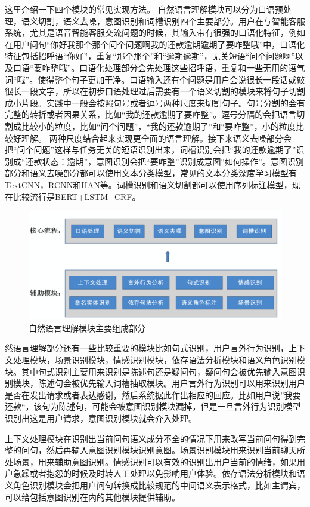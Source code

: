 这里介绍一下四个模块的常见实现方法。
自然语言理解模块可以分为口语预处理，语义切割，语义去噪，意图识别和词槽识别四个主要部分。用户在与智能客服系统，尤其是语音智能客服交流问题的时候，其输入带有很强的口语化特征，例如在用户问句“你好我那个那个问个问题啊我的还款逾期逾期了要咋整哦”中，口语化特征包括招呼语“你好”，重复“那个那个”和“逾期逾期”，无关短语“问个问题啊”以及口语“要咋整哦”。口语化处理部分会先处理这些招呼语，重复和一些无用的语气词“哦”。使得整个句子更加干净。口语输入还有个问题是用户会说很长一段话或敲很长一段文字，所以在初步口语处理过后需要有一个语义切割的模块来将句子切割成小片段。实践中一般会按照句号或者逗号两种尺度来切割句子。句号分割的会有完整的转折或者因果关系，比如“我的还款逾期了要咋整”。逗号分隔的会把语言切割成比较小的粒度，比如“问个问题”，“我的还款逾期了”和“要咋整”，小的粒度比较好理解。 两种尺度结合起来实现更全面的语言理解。接下来语义去噪部分会把“问个问题”这样与任务无关的短语识别出来，词槽识别会把“我的还款逾期了”识别成“还款状态：逾期”，意图识别会把“要咋整”识别成意图“如何操作”。意图识别部分和语义去噪部分都可以使用文本分类模型，常见的文本分类深度学习模型有TextCNN\cite{kim-2014-convolutional}，RCNN\cite{lai2015recurrent}和HAN\cite{yang2016hierarchical}等。词槽识别和语义切割都可以使用序列标注模型，现在比较流行是BERT+LSTM+CRF。
\begin{figure}[H]
\centering
\includegraphics[scale=0.25]{chapters/nlu_process.png}
\caption{自然语言理解模块主要组成部分}
\label{fig:parserexample}
\end{figure}
然语言理解部分还有一些比较重要的模块比如句式识别，用户言外行为识别，上下文处理模块，场景识别模块，情感识别模块，依存语法分析模块和语义角色识别模块。其中句式识别主要用来识别是陈述句还是疑问句，疑问句会被优先输入意图识别模块，陈述句会被优先输入词槽抽取模块。用户言外行为识别可以用来识别用户是否在发出请求或者表达感谢，然后系统据此作出相应的回应。比如用户说”我要还款“，该句为陈述句，可能会被意图识别模块漏掉，但是一旦言外行为识别模型识别出这是用户请求，意图识别模块就会介入处理。

上下文处理模块在识别出当前问句语义成分不全的情况下用来改写当前问句得到完整的问句，然后再输入意图识别模块识别意图。场景识别模块用来识别当前聊天所处场景，用来辅助意图识别。情感识别可以有效的识别出用户当前的情绪，如果用户急躁或者抱怨的时候及时转人工处理以免影响用户体验。依存语法分析模块和语义角色识别模块会把用户问句转换成比较规范的中间语义表示格式，比如主谓宾，可以给包括意图识别在内的其他模块提供辅助。

